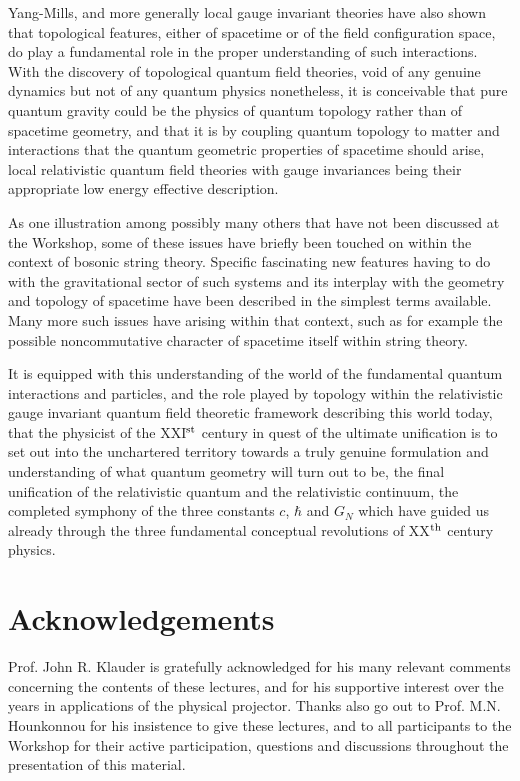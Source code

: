 \documentclass[a4paper,11pt]{article}
\begin{document}
Yang-Mills, and more generally local gauge invariant theories have also
shown that topological features, either of spacetime or of the field
configuration space, do play a fundamental role in the proper understanding
of such interactions. With the discovery of topological quantum field 
theories,\cite{Wit1,Wit2,Wit3} void of any genuine dynamics but not of any 
quantum physics nonetheless, it is conceivable that pure quantum gravity 
could be the physics of quantum to\-po\-lo\-gy rather than of spacetime 
geometry, and that it is by coupling quantum topology to matter and 
interactions that the quantum geometric properties of spacetime should arise,
local relativistic quantum field theories with gauge invariances being
their appropriate low energy effective description.

As one illustration among possibly many others that have not been
discussed at the Workshop, some of these issues have briefly been
touched on within the context of bosonic string theory. Specific 
fascinating new features having to do with the gravitational sector
of such systems and its interplay with the geometry and topology of spacetime
have been described in the simplest terms available. Many more such
issues have arising within that context, such as for example the possible
noncommutative character of spacetime itself within string theory.\cite{SW}

It is equipped with this understanding of the world of the fundamental
quantum interactions and particles, and the role played by topology
within the relativistic gauge invariant quantum field theoretic framework 
describing this world today, that the physicist of the XXI$^{\rm st}$ century
in quest of the ultimate unification is to set out into the unchartered
territory towards a truly genuine formulation and understanding of what
quantum geometry will turn out to be, the final unification of the 
relativistic quantum and the relativistic continuum, the completed 
symphony of the three constants $c$, $\hbar$ and $G_N$ which have guided us 
already through the three fundamental conceptual revolutions of 
XX$^{\rm th}$ century physics.

\section*{Acknowledgements}

Prof. John R. Klauder is gratefully acknowledged for his many relevant
comments concerning the contents of these lectures, and for his supportive
interest over the years in applications of the physical projector. Thanks 
also go out to Prof. M.N. Hounkonnou for his insistence to give these
lectures, and to all participants to the Workshop for their active 
participation, questions and discussions throughout the presentation of 
this material. 
\end{document}
